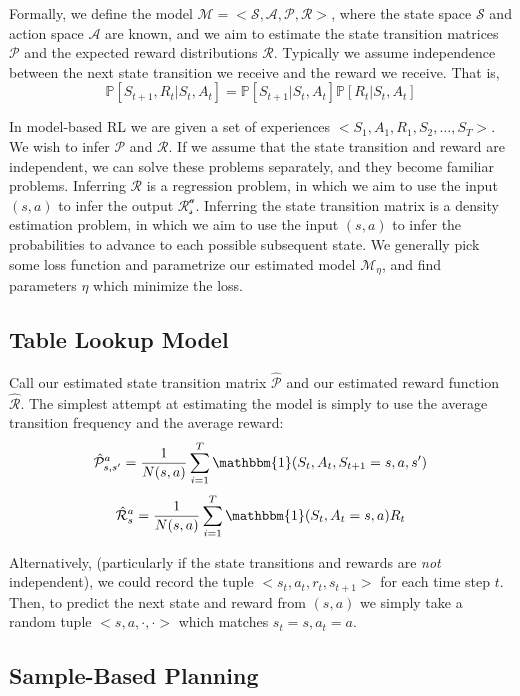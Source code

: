 \documentclass{article}
\newcommand{\ita}{\textit}
\newcommand{\p}{\mathbb{P}}
\begin{document}
Formally, we define the model $\mathcal{M} = <\mathcal{S}, \mathcal{A}, \mathcal{P}, \mathcal{R}>$, where the state space $\mathcal{S}$ and action space $\mathcal{A}$ are known, and we aim to estimate the state transition matrices $\mathcal{P}$ and the expected reward distributions $\mathcal{R}$. Typically we assume independence between the next state transition we receive and the reward we receive. That is,
$$\p[S_{t+1}, R_t | S_t, A_t] = \p[S_{t+1}| S_t, A_t]\p[R_t | S_t, A_t]$$

In model-based RL we are given a set of experiences $<S_1, A_1, R_1, S_2, \ldots, S_T>$. We wish to infer $\mathcal{P}$ and $\mathcal{R}$. If we assume that the state transition and reward are independent, we can solve these problems separately, and they become familiar problems. Inferring $\mathcal{R}$ is a regression problem, in which we aim to use the input $(s, a)$ to infer the output $\mathcal{R^a_s}$. Inferring the state transition matrix is a density estimation problem, in which we aim to use the input $(s, a)$ to infer the probabilities to advance to each possible subsequent state. We generally pick some loss function and parametrize our estimated model $\mathcal{M}_\eta$, and find parameters $\eta$ which minimize the loss.

\subsection{Table Lookup Model}

Call our estimated state transition matrix $\hat{\mathcal{P}}$ and our estimated reward function $\hat{\mathcal{R}}$. The simplest attempt at estimating the model is simply to use the average transition frequency and the average reward:
$$\hat{\mathcal{P}}^a_{s, s'} = \frac{1}{N(s, a)}\sum_{i=1}^T \mathbbm{1}(S_t, A_t, S_{t+1} = s, a, s')$$
$$\hat{\mathcal{R}}^a_s = \frac{1}{N(s, a)}\sum_{i=1}^T \mathbbm{1}(S_t, A_t = s, a)R_t$$

Alternatively, (particularly if the state transitions and rewards are \ita{not} independent), we could record the tuple $<s_t, a_t, r_t, s_{t+1}>$ for each time step $t$. Then, to predict the next state and reward from $(s, a)$ we simply take a random tuple $<s, a, \cdot, \cdot>$ which matches $s_t = s, a_t = a$.

\subsection{Sample-Based Planning}
\end{document}
